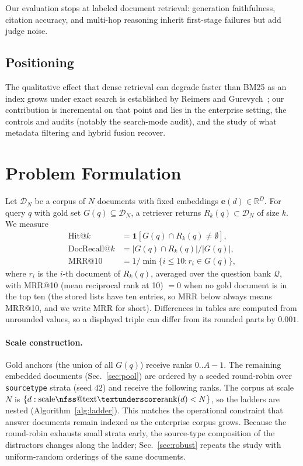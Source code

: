 \documentclass{ieeeaccess}
\makeatletter
\DeclareRobustCommand{\_}{\ifmmode\nfss@text{\textunderscore}\else\textunderscore\allowbreak\fi}
\makeatother
\begin{document}
Our evaluation stops at labeled document retrieval: generation faithfulness, citation accuracy, and multi-hop reasoning inherit first-stage failures but add judge noise.

\subsection{Positioning}
The qualitative effect that dense retrieval can degrade faster than BM25 as an index grows under exact search is established by Reimers and Gurevych~\cite{reimers2021curse}; our contribution is incremental on that point and lies in the enterprise setting, the controls and audits (notably the search-mode audit), and the study of what metadata filtering and hybrid fusion recover.


\section{Problem Formulation}
\label{sec:problem}
Let $\mathcal{D}_N$ be a corpus of $N$ documents with fixed embeddings $\mathbf{e}(d)\in\mathbb{R}^{D}$. For query $q$ with gold set $G(q)\subseteq\mathcal{D}_N$, a retriever returns $R_k(q)\subset\mathcal{D}_N$ of size $k$. We measure
\begin{align}
\mathrm{Hit@}k &= \mathbf{1}\!\left[G(q)\cap R_k(q)\neq\emptyset\right], \\
\mathrm{DocRecall@}k &= |G(q)\cap R_k(q)|/|G(q)|, \\
\mathrm{MRR@10} &= 1/\min\{i\le10: r_i\in G(q)\},
\end{align}
where $r_i$ is the $i$-th document of $R_k(q)$, averaged over the question bank $\mathcal{Q}$, with MRR@10 (mean reciprocal rank at 10) $=0$ when no gold document is in the top ten (the stored lists have ten entries, so MRR below always means MRR@10, and we write MRR for short). Differences in tables are computed from unrounded values, so a displayed triple can differ from its rounded parts by $0.001$.

\paragraph{Scale construction.}
Gold anchors (the union of all $G(q)$) receive ranks $0..A{-}1$. The remaining embedded documents (Sec.~\ref{sec:pool}) are ordered by a seeded round-robin over \texttt{source\_type} strata (seed $42$) and receive the following ranks. The corpus at scale $N$ is $\{d:\mathrm{scale\_rank}(d)<N\}$, so the ladders are nested (Algorithm~\ref{alg:ladder}). This matches the operational constraint that answer documents remain indexed as the enterprise corpus grows. Because the round-robin exhausts small strata early, the source-type composition of the distractors changes along the ladder; Sec.~\ref{sec:robust} repeats the study with uniform-random orderings of the same documents.
\end{document}
